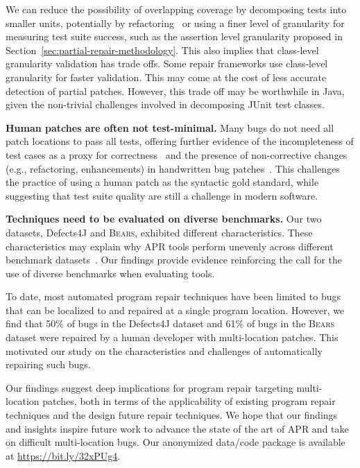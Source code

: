 \documentclass[10pt, conference]{IEEEtran}
\newcommand\bears{\textsc{Bears}\xspace}
\begin{document}
We can reduce the possibility of overlapping coverage by decomposing tests into
smaller units, potentially by
refactoring~\cite{b-refactoring} or using a finer level of granularity for
measuring test suite success, such as the assertion level granularity proposed
in Section~\ref{sec:partial-repair-methodology}.
This also implies that class-level granularity validation has trade offs. Some
repair frameworks use class-level granularity for faster validation. This may
come at the cost of less accurate detection of partial patches. However, this
trade off may be worthwhile in Java, given the non-trivial challenges involved in
decomposing JUnit test classes.

\vspace{1ex}
\noindent\textbf{Human patches are often not test-minimal.}
Many bugs do not need all patch locations to pass all tests,
offering further evidence of the incompleteness of test cases as a
proxy for correctness~\cite{patch-correctness} and the
presence of non-corrective changes (e.g., refactoring, enhancements)
in handwritten bug patches~\cite{api-refactoring, tangledchanges}.  This
challenges the practice of using a human patch as the syntactic gold standard,
while suggesting that test suite quality
are still a challenge in modern software.

\vspace{1ex}
\noindent\textbf{Techniques need to be evaluated on diverse benchmarks.}
Our two datasets, Defects4J and \bears, exhibited different characteristics.
These characteristics may explain why APR tools perform unevenly across
different benchmark datasets~\cite{durieux-repair-them-all}. Our findings
provide evidence reinforcing the call for the use of diverse benchmarks when
evaluating tools.

\vspace{1ex}
To date, most automated program repair techniques have been limited to bugs that
can be localized to and repaired at a single program location. However, we find
that 50\% of bugs in the Defects4J dataset and 61\% of bugs in the \bears dataset
were repaired by a human developer with multi-location patches. This motivated
our study on the characteristics and challenges of automatically repairing such bugs. 

Our findings suggest deep implications for program repair targeting
multi-location patches, both in terms of the applicability of existing program
repair techniques and the design future repair techniques.  We hope that our
findings and insights inspire future work to advance the state of the art of APR
and take on difficult multi-location bugs.  Our anonymized data/code package is
available at \url{https://bit.ly/32xPUg4}.



\end{document}
